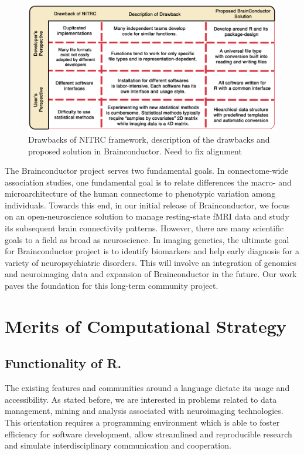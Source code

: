 \documentclass{nature}
\begin{document}
\begin{figure}[tb]
\centering
\includegraphics[width=400pt]{fig/brainconductor/brainconductor_nitrc_chart_v2.png}
\caption{Drawbacks of NITRC framework, description of the drawbacks and proposed
solution
in Brainconductor. {\color{red}Need to fix alignment}}
\label{fig:nitrc}
\end{figure}


The Brainconductor project serves two fundamental goals. In connectome-wide
association studies, one fundamental goal is to relate differences the macro- and
microarchitecture of the human connectome to phenotypic variation among
individuals\cite{milham2012open}. Towards this end,
in our
initial release of Brainconductor, we focus on an open-neuroscience
solution to manage resting-state fMRI data and study its
subsequent brain connectivity patterns.
However, there are many scientific goals to a field as broad as neuroscience.
In imaging genetics, the ultimate goal
for Brainconductor project is to identify biomarkers and help early diagnosis
for a variety of neuropsychiatric disorders. This will involve an
integration of genomics and neuroimaging data and expansion of Brainconductor
in the future. Our work paves the foundation for this long-term community 
project.


\section{Merits of Computational Strategy}

\subsection{Functionality of R.}
The existing features and communities around a language dictate
its usage and accessibility. As stated before, we are
interested in problems related to data management, mining and analysis
associated with neuroimaging technologies. This orientation requires
a programming environment which is able to foster
efficiency for software development, allow
streamlined and reproducible research and simulate
interdisciplinary communication and cooperation.
\end{document}
